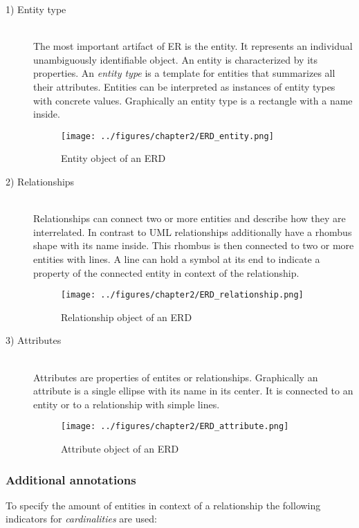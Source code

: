 \documentclass[twoside, openright, 12pt]{book}
\begin{document}
\begin{description}
\item[1) Entity type]\hfill \\
The most important artifact of ER is the entity.
It represents an individual unambiguously identifiable object.
An entity is characterized by its properties.
An \textit{entity type} is a template for entities that summarizes all their attributes.
Entities can be interpreted as instances of entity types with concrete values.
Graphically an entity type is a rectangle with a name inside.

\begin{figure}[htb]
	\centering
	\texttt{[image: ../figures/chapter2/ERD\_entity.png]}
	\caption{Entity object of an ERD}
	\label{fig:ERD_entity}
\end{figure}

\item[2) Relationships]\hfill \\
Relationships can connect two or more entities and describe how they are interrelated.
In contrast to UML relationships additionally have a rhombus shape with its name inside.
This rhombus is then connected to two or more entities with lines.
A line can hold a symbol at its end to indicate a property of the connected entity in context of the relationship.

\begin{figure}[htb]
	\centering
	\texttt{[image: ../figures/chapter2/ERD\_relationship.png]}
	\caption{Relationship object of an ERD}
	\label{fig:ERD_relationship}
\end{figure}

\item[3) Attributes]\hfill \\
Attributes are properties of entites or relationships.
Graphically an attribute is a single ellipse with its name in its center.
It is connected to an entity or to a relationship with simple lines.

\begin{figure}[htb]
	\centering
	\texttt{[image: ../figures/chapter2/ERD\_attribute.png]}
	\caption{Attribute object of an ERD}
	\label{fig:ERD_}
\end{figure}
\end{description}

\subsubsection{Additional annotations}
\label{ER_additional_annotations}
To specify the amount of entities in context of a relationship the following indicators for \textit{cardinalities} are used:
\end{document}
